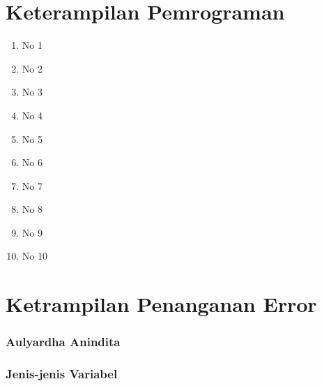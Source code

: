 \part{Keterampilan Pemrograman}
\begin{enumerate}
	\item No 1
	
	
	\item No 2
	
	
	\item No 3
	
	
	\item No 4
	
	
	\item No 5
	
	
	\item No 6
	
	
	\item No 7
	
	
	\item No 8
	
	
	\item No 9
	
	
	\item No 10
	
	
\end{enumerate}


\part{Ketrampilan Penanganan Error}


\section{Aulyardha Anindita}
\section{Jenis-jenis Variabel}
